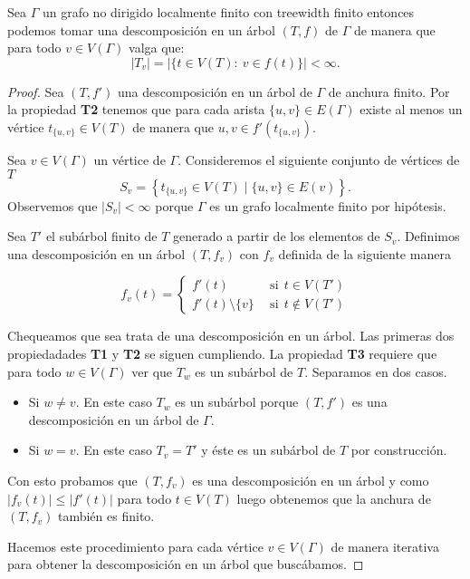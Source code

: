 \documentclass[tesis.tex]{subfiles}
\begin{document}
\begin{prop}\label{prop_tw_finitos_bolsones}
	Sea $\Gamma$ un grafo no dirigido localmente finito con treewidth finito entonces podemos tomar una descomposición en un árbol $(T,f)$ de $\Gamma$ de manera que para todo $v \in V(\Gamma)$ valga que:
	\[
	|T_{v}| = | \{  t \in V(T) : \ v \in f(t)  \} | < \infty.
	\]
\end{prop}
\begin{proof}
	Sea $(T,f')$ una descomposición en un árbol de $\Gamma$ de anchura finito.
	Por la propiedad \textbf{T2} tenemos que para cada arista 
	$\{u,v\} \in E(\Gamma)$ existe al menos un vértice $t_{\{u,v\}} \in V(T)$ de manera que $u,v \in f'(t_{\{u,v\}})$.
	
	Sea $v \in V(\Gamma)$ un vértice  de $\Gamma$.
	Consideremos el siguiente conjunto de vértices de $T$
	\[
		S_{v} =  \left\{  t_{\{u,v\}} \in V(T) \mid \{u,v\} \in E(v)  \right\}.
	\]
	Observemos que $|S_{v}| < \infty$ porque $\Gamma$ es un grafo localmente finito por hipótesis.

	Sea $T'$ el subárbol finito de $T$ generado a partir de los elementos de $S_{v}$.
	Definimos una descomposición en un árbol $(T,f_{v})$ con $f_{v}$ definida de la siguiente manera
	
	\[
	f_{v}(t) = 
	\begin{cases}
		f'(t)  \ \  &\text{si} \ \  t \in V(T') \\
		f'(t) \setminus \{  v \} \ \  &\text{si} \ \  t \notin V(T')
	\end{cases}
	\]
	
	
	Chequeamos que sea trata de una descomposición en un árbol.
	Las primeras dos propiedadades \textbf{T1} y \textbf{T2} se siguen cumpliendo.
	La propiedad \textbf{T3} requiere que para todo $w \in V(\Gamma)$ ver que $T_{w}$ es un subárbol de $T$.
	Separamos en dos casos.
	\begin{itemize}
		\item Si $w \neq v$. 
			En este caso $T_{w}$ es un subárbol porque $(T,f')$ es una descomposición en un árbol de $\Gamma$.

		\item Si $w = v$.
			En este caso $T_{v} = T'$ y éste es un subárbol de $T$ por construcción.
	\end{itemize}
	
	Con esto probamos que $(T,f_{v})$ es una descomposición en un árbol y como $|f_{v}(t)| \le |f'(t)|$ para todo $t \in V(T)$ luego obtenemos que la anchura de $(T,f_{v})$ también es finito.
	
	Hacemos este procedimiento para cada vértice $v \in V(\Gamma)$ de manera iterativa para obtener la descomposición en un árbol que buscábamos.
	
\end{proof}
\end{document}
